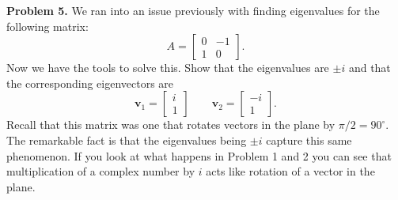 \documentclass[12pt]{report} %
\theoremstyle{definition}
\begin{document}
\noindent\textbf{Problem 5.} We ran into an issue previously with finding eigenvalues for the following matrix:
\[
A=\begin{bmatrix} 0 & -1 \\ 1 & 0 \end{bmatrix}.
\]
Now we have the tools to solve this.  Show that the eigenvalues are $\pm i$ and that the corresponding eigenvectors are 
\[
\mathbf{v}_1 = \begin{bmatrix} i \\ 1 \end{bmatrix} \qquad \mathbf{v}_2 = \begin{bmatrix} -i \\ 1 \end{bmatrix}.
\]
Recall that this matrix was one that rotates vectors in the plane by $\pi/2=90^\circ$.  The remarkable fact is that the eigenvalues being $\pm i$ capture this same phenomenon.  If you look at what happens in Problem 1 and 2 you can see that multiplication of a complex number by $i$ acts like rotation of a vector in the plane.
\end{document}
